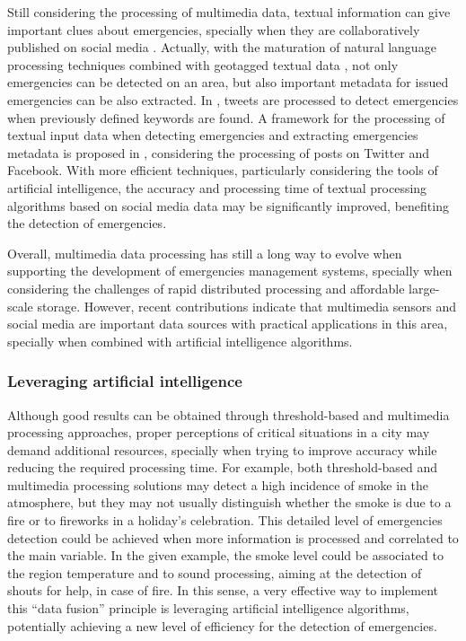 \begin{refsection}
Still considering the processing of multimedia data, textual information can give important clues about emergencies, specially when they are collaboratively published on social media \cite{socialmedia5}. Actually, with the maturation of natural language processing techniques combined with geotagged textual data \cite{naturalLanguage}, not only emergencies can be detected on an area, but also important metadata for issued emergencies can be also extracted. In \cite{twitterDetection2,socialmedia1,twitterDetection1}, tweets are processed to detect emergencies when previously defined keywords are found. A framework for the processing of textual input data when detecting emergencies and extracting emergencies metadata is proposed in \cite{twitterDetection3}, considering the processing of posts on Twitter and Facebook. With more efficient techniques, particularly considering the tools of artificial intelligence, the accuracy and processing time of textual processing algorithms based on social media data may be significantly improved, benefiting the detection of emergencies. 

Overall, multimedia data processing has still a long way to evolve when supporting the development of emergencies management systems, specially when considering the challenges of rapid distributed processing and affordable large-scale storage. However, recent contributions indicate that multimedia sensors and social media are important data sources with practical applications in this area, specially when combined with artificial intelligence algorithms. 

\subsubsection{Leveraging artificial intelligence}

Although good results can be obtained through threshold-based and multimedia processing approaches, proper perceptions of critical situations in a city may demand additional resources, specially when trying to improve accuracy while reducing the required processing time. For example, both threshold-based and multimedia processing solutions may detect a high incidence of smoke in the atmosphere, but they may not usually distinguish whether the smoke is due to a fire or to fireworks in a holiday's celebration. This detailed level of emergencies detection could be achieved when more information is processed and correlated to the main variable. In the given example, the smoke level could be associated to the region temperature and to sound processing, aiming at the detection of shouts for help, in case of fire. In this sense, a very effective way to implement this ``data fusion'' principle is leveraging artificial intelligence algorithms, potentially achieving a new level of efficiency for the detection of emergencies. 


\end{refsection}
